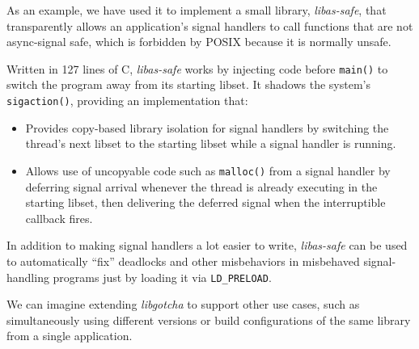 As an example, we have used it to implement a small library, \textit{libas-safe},
that transparently allows an application's signal handlers to call functions that
are not async-signal safe, which is forbidden by POSIX because it is normally unsafe.

Written in 127 lines of C, \textit{libas-safe} works by injecting code before
\texttt{main()} to switch the program away from its starting libset.  It shadows
the system's \texttt{sigaction()}, providing an implementation that:
\begin{itemize}
\item Provides copy-based library isolation for signal handlers by switching the
	thread's next libset to the starting libset while a signal handler is running.
\item Allows use of uncopyable code such as \texttt{malloc()} from a signal
	handler by deferring signal arrival whenever the thread is already executing
	in the starting libset, then delivering the deferred signal when the
	interruptible callback fires.
\end{itemize}

In addition to making signal handlers a lot easier to write, \textit{libas-safe} can
be used to automatically ``fix'' deadlocks and other misbehaviors in misbehaved
signal-handling programs just by loading it via \texttt{LD\_PRELOAD}.

We can imagine extending \textit{libgotcha} to support other use cases, such as
simultaneously using different versions or build configurations of the same library
from a single application.





